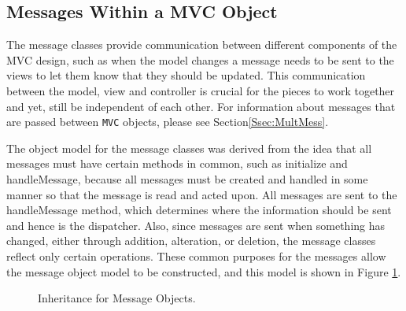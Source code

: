 \documentclass{article}[11pt]
\newcommand{\Rfunction}[1]{{\textsf{#1}}}
\newcommand{\Robject}[1]{{\texttt{#1}}}
\begin{document}
\subsection{Messages Within a MVC Object}\label{Ssec:OneMess}

The message classes provide communication between different
components of the MVC design, such as when the model changes a message needs
to be sent to the views to let them know that they should be updated.  This
communication between the model, view and controller is crucial for the pieces
to work together and yet, still be independent of each other.  For information
about messages that are passed between \Robject{MVC} objects, please see
Section\ref{Ssec:MultMess}. 

The object model for the message classes was derived from the idea
that all messages must have certain methods in common, such as
\Rfunction{initialize} and \Rfunction{handleMessage}, because all
messages must be created and handled in some manner so that the
message is read and acted upon.  All messages are sent to
the \Rfunction{handleMessage} method, which determines where the information
should be sent and hence is the dispatcher.   Also, since messages
are sent when something has changed, either through addition, alteration, or
deletion, the message classes reflect only certain operations.  These
common purposes for the messages allow the message object
model to be constructed, and this model is shown in Figure \ref{Fig:Mess}.

\begin{figure}[ht]
  \begin{center}
    \caption{ Inheritance for Message Objects. }
    \label{Fig:Mess}
  \end{center}
\end{figure}
\end{document}
